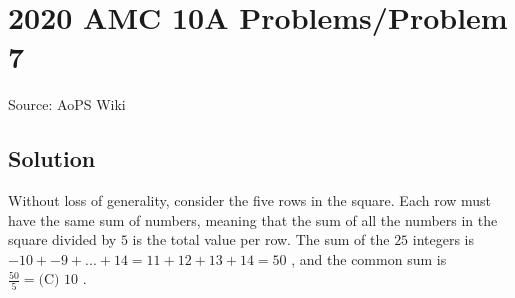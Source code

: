 \documentclass[12pt]{article}
\begin{document}
\section*{{2020 AMC 10A Problems/Problem 7}}
Source: AoPS Wiki

\subsection*{Solution}
Without loss of generality, consider the five rows in the square. Each row must have the same sum of numbers, meaning that the sum of all the numbers in the square divided by $5$ is the total value per row. The sum of the $25$ integers is $-10+-9+...+14=11+12+13+14=50$ , and the common sum is $\frac{50}{5}=\boxed{\text{(C) }10}$ .
\end{document}
